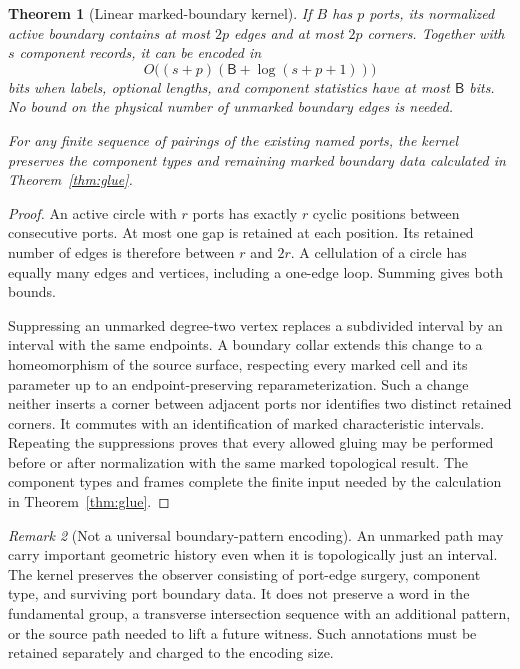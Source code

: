 \documentclass[11pt]{article}
\newtheorem{theorem}{Theorem}[section]
\theoremstyle{definition}
\theoremstyle{remark}\newtheorem{remark}[theorem]{Remark}
\newcommand{\bits}{\mathsf B}
\begin{document}
\begin{theorem}[Linear marked-boundary kernel]\label{thm:kernel}
If $B$ has $p$ ports, its normalized active boundary contains at most $2p$ edges and at most $2p$ corners. Together with $s$ component records, it can be encoded in
\[
 O\big((s+p)(\bits+\log(s+p+1))\big)
\]
bits when labels, optional lengths, and component statistics have at most $\bits$ bits. No bound on the physical number of unmarked boundary edges is needed.

For any finite sequence of pairings of the existing named ports, the kernel preserves the component types and remaining marked boundary data calculated in Theorem~\ref{thm:glue}.
\end{theorem}
\begin{proof}
An active circle with $r$ ports has exactly $r$ cyclic positions between consecutive ports. At most one gap is retained at each position. Its retained number of edges is therefore between $r$ and $2r$. A cellulation of a circle has equally many edges and vertices, including a one-edge loop. Summing gives both bounds.

Suppressing an unmarked degree-two vertex replaces a subdivided interval by an interval with the same endpoints. A boundary collar extends this change to a homeomorphism of the source surface, respecting every marked cell and its parameter up to an endpoint-preserving reparameterization. Such a change neither inserts a corner between adjacent ports nor identifies two distinct retained corners. It commutes with an identification of marked characteristic intervals. Repeating the suppressions proves that every allowed gluing may be performed before or after normalization with the same marked topological result. The component types and frames complete the finite input needed by the calculation in Theorem~\ref{thm:glue}.
\end{proof}

\begin{remark}[Not a universal boundary-pattern encoding]
An unmarked path may carry important geometric history even when it is topologically just an interval. The kernel preserves the observer consisting of port-edge surgery, component type, and surviving port boundary data. It does not preserve a word in the fundamental group, a transverse intersection sequence with an additional pattern, or the source path needed to lift a future witness. Such annotations must be retained separately and charged to the encoding size.
\end{remark}
\end{document}
